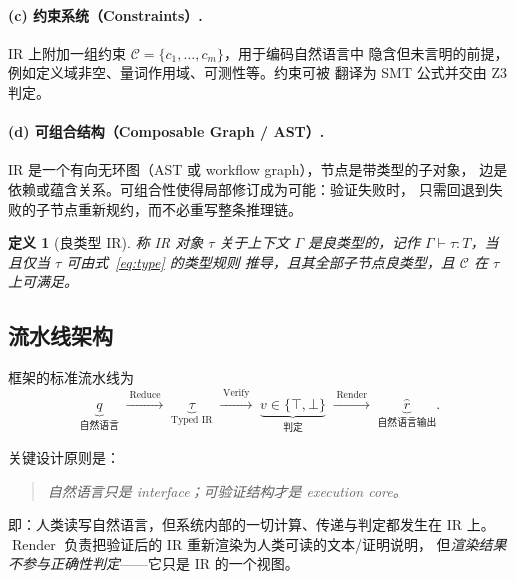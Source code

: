 \documentclass[UTF8,a4paper,11pt]{ctexart}
\newtheorem{definition}{定义}[section]
\DeclareMathOperator{\Verify}{Verify}
\DeclareMathOperator{\Reduce}{Reduce}
\DeclareMathOperator{\Render}{Render}
\begin{document}
\paragraph{(c) 约束系统（Constraints）.}
IR 上附加一组约束 $\mathcal{C} = \{c_1, \dots, c_m\}$，用于编码自然语言中
隐含但未言明的前提，例如定义域非空、量词作用域、可测性等。约束可被
翻译为 SMT 公式并交由 Z3 \citep{demoura2008z3} 判定。

\paragraph{(d) 可组合结构（Composable Graph / AST）.}
IR 是一个有向无环图（AST 或 workflow graph），节点是带类型的子对象，
边是依赖或蕴含关系。可组合性使得局部修订成为可能：验证失败时，
只需回退到失败的子节点重新规约，而不必重写整条推理链。

\begin{definition}[良类型 IR]\label{def:welltyped}
称 IR 对象 $\tau$ 关于上下文 $\Gamma$ 是\emph{良类型的}，记作
$\Gamma \vdash \tau : T$，当且仅当 $\tau$ 可由式~\eqref{eq:type} 的类型规则
推导，且其全部子节点良类型，且 $\mathcal{C}$ 在 $\tau$ 上可满足。
\end{definition}

\subsection{流水线架构}

框架的标准流水线为
\begin{equation}\label{eq:pipeline}
  \underbrace{q}_{\text{自然语言}}
  \;\xrightarrow{\;\Reduce\;}\;
  \underbrace{\tau}_{\text{Typed IR}}
  \;\xrightarrow{\;\Verify\;}\;
  \underbrace{v \in \{\top, \bot\}}_{\text{判定}}
  \;\xrightarrow{\;\Render\;}\;
  \underbrace{\hat{r}}_{\text{自然语言输出}} .
\end{equation}

关键设计原则是：

\begin{quote}
\itshape
自然语言只是 interface；可验证结构才是 execution core。
\end{quote}

即：人类读写自然语言，但系统内部的一切计算、传递与判定都发生在 IR 上。
$\Render$ 负责把验证后的 IR 重新渲染为人类可读的文本/证明说明，
但\emph{渲染结果不参与正确性判定}——它只是 IR 的一个视图。
\end{document}
